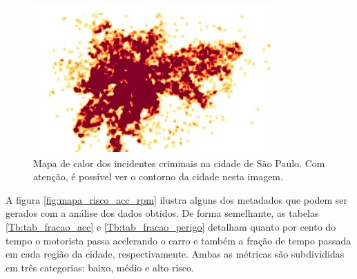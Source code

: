 \begin{figure}[hp]
    \centering
    
    \includegraphics[scale= 1]{figures/mapa_calor_violencia.jpeg}
    
    \caption{Mapa de calor dos incidentes criminais na cidade de São Paulo. Com atenção, é possível ver o contorno da cidade nesta imagem.}
    \label{fig:mapa_calor_violencia}
    
\end{figure}

A figura \ref{fig:mapa_risco_acc_rpm} ilustra alguns dos metadados que podem ser gerados com a análise dos dados obtidos. De forma semelhante, as tabelas \ref{Tb:tab_fracao_acc} e \ref{Tb:tab_fracao_perigo} detalham quanto por cento do tempo o motorista passa acelerando o carro e também a fração de tempo passada em cada região da cidade, respectivamente. Ambas as métricas são subdivididas em três categorias: baixo, médio e alto risco.


% 


    
    
    
    

